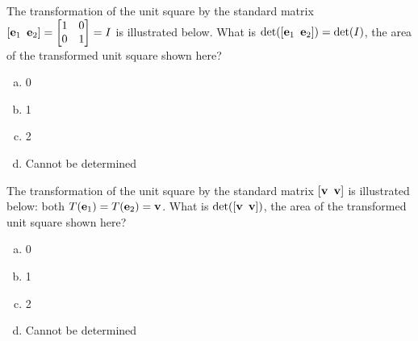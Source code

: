 \begin{applicationActivities}
\begin{activity}{2}
The transformation of the unit square by the
standard matrix \([\vec{e}_1\hspace{0.5em} \vec{e}_2]=\begin{bmatrix}1&0\\0&1\end{bmatrix}=I\) is illustrated below.
What is $\det([\vec{e}_1\hspace{0.5em} \vec{e}_2])=\det(I)$, the
area of the transformed unit square shown here?
\begin{center}
\end{center}
  \begin{enumerate}[a)]
    \item 0
    \item 1
    \item 2
    \item Cannot be determined
  \end{enumerate}
\end{activity}

\begin{activity}{2}
The transformation of the unit square by the
standard matrix \([\vec{v}\hspace{0.5em} \vec{v}]\) is illustrated below: both
\(T(\vec{e}_1)=T(\vect{e}_2)=\vec{v}\).
What is \(\det([\vec{v}\hspace{0.5em} \vec{v}])\), 
the area of the transformed unit square shown here?
\begin{center}
\end{center}
  \begin{enumerate}[a)]
    \item 0
    \item 1
    \item 2
    \item Cannot be determined
  \end{enumerate}
\end{activity}



\end{applicationActivities}
